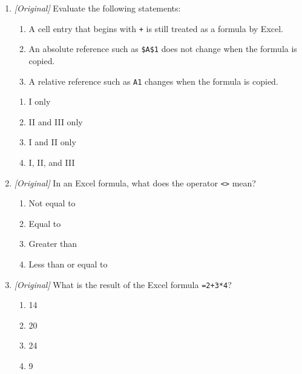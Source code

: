 \documentclass[11pt]{article}
\begin{document}
\begin{enumerate}[label=\textbf{Q\arabic*.}, leftmargin=*]
\begin{enumerate}[label=\Alph*.]
    \item \texttt{A\$1} locks the column, and \texttt{\$A1} locks the row.
    \item \texttt{\$A\$1} locks only the row.
  \end{enumerate}
\item \textit{[Original]} Evaluate the following statements:
  \begin{enumerate}[label=\Roman*.]
    \item A cell entry that begins with \texttt{+} is still treated as a
      formula by Excel.
    \item An absolute reference such as \texttt{\$A\$1} does not change when
      the formula is copied.
    \item A relative reference such as \texttt{A1} changes when the formula is
      copied.
  \end{enumerate}
  \begin{enumerate}[label=\Alph*.]
    \item I only
    \item II and III only
    \item I and II only
    \item I, II, and III
  \end{enumerate}
\item \textit{[Original]} In an Excel formula, what does the operator
  \texttt{<>} mean?
  \begin{enumerate}[label=\Alph*.]
    \item Not equal to
    \item Equal to
    \item Greater than
    \item Less than or equal to
  \end{enumerate}
\item \textit{[Original]} What is the result of the Excel formula
  \texttt{=2+3*4}?
  \begin{enumerate}[label=\Alph*.]
    \item 14
    \item 20
    \item 24
    \item 9
  \end{enumerate}


\end{enumerate}
\end{document}
